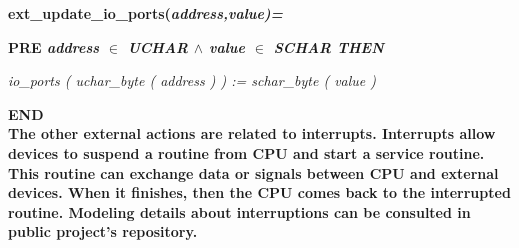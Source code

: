 \documentclass[a4paper]{llncs}
\begin{document}
\hspace*{0.00in}\bf ext\_update\_io\_ports\rm (\it address\rm ,\it value\rm )\rm =

\hspace*{0.20in}\bf PRE \it address  $\in$  \it UCHAR  $\land$ \hspace*{0.10in}\it value  $\in$  \it SCHAR \bf THEN

\hspace*{0.20in}\it io\_ports \rm ( \it uchar\_byte \rm ( \it address \rm ) \rm ) \rm := \it schar\_byte \rm ( \it
value \rm )

\hspace*{0.00in}\bf END\rm \\

The other external actions are related to interrupts. Interrupts allow
devices to suspend a routine from CPU and start a service routine.
This routine can exchange data or signals between CPU and external
devices. When it finishes, then the CPU comes back to the interrupted
routine. Modeling details about interruptions can be consulted in
public project's repository.
\end{document}

